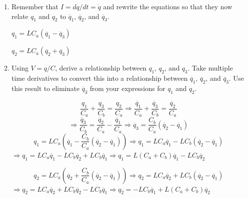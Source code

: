 \documentclass[fleqn]{article}
\begin{document}
\begin{enumerate}[nolistsep]
\begin{enumerate}[nolistsep]
				\item Remember that $I=dq/dt=\dot{q}$ and rewrite the equations so that they now relate $q_1$ and $q_2$ to $\ddot{q_1}$, $\ddot{q_2}$, and $\ddot{q_3}$.
				
					$q_1 = LC_a(\ddot{q_1} - \ddot{q_3})$
					
					$q_2 = LC_a(\ddot{q_2} + \ddot{q_3})$
					
				\item Using $V=q/C$, derive a relationship between $q_1$, $q_2$, and $q_3$. Take multiple time derivatives to convert this into a relationship between $\ddot{q_1}$, $\ddot{q_2}$, and $\ddot{q_3}$. Use this result to eliminate $\ddot{q_3}$ from your expressions for $q_1$ and $q_2$.
				
					\begin{equation*}
						\frac{q_1}{C_a} + \frac{q_3}{C_b} = \frac{q_2}{C_a} \Rightarrow \frac{\ddot{q_1}}{C_a} + \frac{\ddot{q_3}}{C_b} = \frac{\ddot{q_2}}{C_a}
					\end{equation*}
					\begin{equation*}
						 \Rightarrow \frac{\ddot{q_3}}{C_b} = \frac{\ddot{q_2}}{C_a} - \frac{\ddot{q_1}}{C_a} \Rightarrow \ddot{q_3} = \frac{C_b}{C_a}(\ddot{q_2} - \ddot{q_1})
					\end{equation*}
					\begin{equation*}
						q_1 = LC_a\left(\ddot{q_1} - \frac{C_b}{C_a}(\ddot{q_2} - \ddot{q_1})\right) \Rightarrow q_1 = LC_a\ddot{q_1} - LC_b(\ddot{q_2} - \ddot{q_1})
					\end{equation*}
					$\Rightarrow q_1 = LC_a\ddot{q_1} - LC_b\ddot{q_2} + LC_b\ddot{q_1} \Rightarrow q_1 = L(C_a + C_b)\ddot{q_1} - LC_b\ddot{q_2}$
					
					\begin{equation*}
						q_2 = LC_a\left(\ddot{q_2} + \frac{C_b}{C_a}(\ddot{q_2} - \ddot{q_1})\right) \Rightarrow q_2 = LC_a\ddot{q_2} + LC_b(\ddot{q_2} - \ddot{q_1})
					\end{equation*}
					$\Rightarrow q_2 = LC_a\ddot{q_2} + LC_b\ddot{q_2} - LC_b\ddot{q_1} \Rightarrow q_2 = - LC_b\ddot{q_1} + L(C_a + C_b)\ddot{q_2}$
					
			\end{enumerate}
	\end{enumerate}
\end{document}
